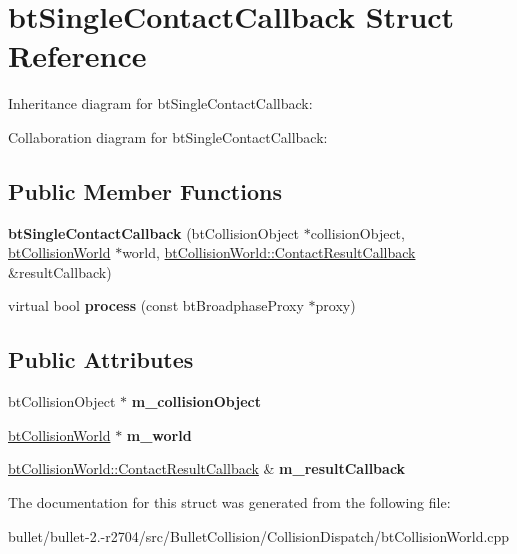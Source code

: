 \hypertarget{structbt_single_contact_callback}{\section{bt\+Single\+Contact\+Callback Struct Reference}
\label{structbt_single_contact_callback}
}


Inheritance diagram for bt\+Single\+Contact\+Callback\+:


Collaboration diagram for bt\+Single\+Contact\+Callback\+:
\subsection*{Public Member Functions}
\begin{DoxyCompactItemize}
\item 
\hypertarget{structbt_single_contact_callback_a9c6c4b7e863c6a01053a08e882937416}{{\bfseries bt\+Single\+Contact\+Callback} (bt\+Collision\+Object $\ast$collision\+Object, \hyperlink{classbt_collision_world}{bt\+Collision\+World} $\ast$world, \hyperlink{structbt_collision_world_1_1_contact_result_callback}{bt\+Collision\+World\+::\+Contact\+Result\+Callback} \&result\+Callback)}\label{structbt_single_contact_callback_a9c6c4b7e863c6a01053a08e882937416}

\item 
\hypertarget{structbt_single_contact_callback_aa08708f3a017a15d76ee4869dd4eb0b2}{virtual bool {\bfseries process} (const bt\+Broadphase\+Proxy $\ast$proxy)}\label{structbt_single_contact_callback_aa08708f3a017a15d76ee4869dd4eb0b2}

\end{DoxyCompactItemize}
\subsection*{Public Attributes}
\begin{DoxyCompactItemize}
\item 
\hypertarget{structbt_single_contact_callback_a83e0019896080e07b50fc9b4e91bc4ef}{bt\+Collision\+Object $\ast$ {\bfseries m\+\_\+collision\+Object}}\label{structbt_single_contact_callback_a83e0019896080e07b50fc9b4e91bc4ef}

\item 
\hypertarget{structbt_single_contact_callback_ad69cfb32bb7f53413d7910e6cbe05542}{\hyperlink{classbt_collision_world}{bt\+Collision\+World} $\ast$ {\bfseries m\+\_\+world}}\label{structbt_single_contact_callback_ad69cfb32bb7f53413d7910e6cbe05542}

\item 
\hypertarget{structbt_single_contact_callback_a847acf04fa01213638a783537d485362}{\hyperlink{structbt_collision_world_1_1_contact_result_callback}{bt\+Collision\+World\+::\+Contact\+Result\+Callback} \& {\bfseries m\+\_\+result\+Callback}}\label{structbt_single_contact_callback_a847acf04fa01213638a783537d485362}

\end{DoxyCompactItemize}


The documentation for this struct was generated from the following file\+:\begin{DoxyCompactItemize}
\item 
bullet/bullet-\/2.-\/r2704/src/\+Bullet\+Collision/\+Collision\+Dispatch/bt\+Collision\+World.\+cpp\end{DoxyCompactItemize}
